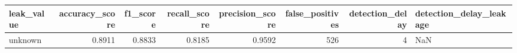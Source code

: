 \begin{tabular}{lrrrrrrl}
\toprule
leak\_value & accuracy\_score & f1\_score & recall\_score & precision\_score & false\_positives & detection\_delay & detection\_delay\_leakage \\
\midrule
unknown & 0.8911 & 0.8833 & 0.8185 & 0.9592 & 526 & 4 & NaN \\
\bottomrule
\end{tabular}

